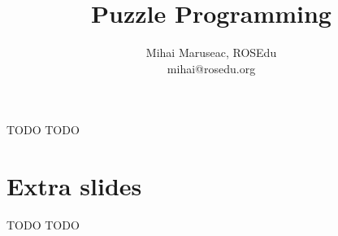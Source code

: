 \documentclass{beamer}
\title{Puzzle Programming}
\author{Mihai Maruseac, ROSEdu\\mihai@rosedu.org}
\begin{document}
\maketitle

\begin{frame}{TODO}
  TODO
\end{frame}

\section{Extra slides}
\frame{\tableofcontents[currentsection]}

\begin{frame}{TODO}
  TODO
\end{frame}
\end{document}
